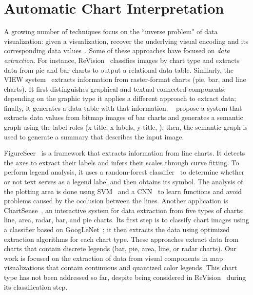 \section{Automatic Chart Interpretation}
\label{sec:chartInterpretation}
A growing number of techniques focus on the ``inverse problem" of data visualization: given a visualization, recover the underlying visual encoding and its corresponding data values~\citep{Poco2017a}. Some of these approaches have focused on \emph{data extraction}. For instance, ReVision~\citep{Savva2011} classifies images by chart type and extracts data from pie and bar charts to output a relational data table. Similarly, the VIEW system~\citep{Gao2012} extracts information from raster-format charts (\eg pie, bar, and line charts). It first distinguishes graphical and textual connected-components; depending on the graphic type it applies a different approach to extract data; finally, it generates a data table with that information. \citeauthor{Al-Zaidy2016}~\citet{Al-Zaidy2016} propose a system that extracts data values from bitmap images of bar charts and generates a semantic graph using the label roles (\eg x-title, x-labels, y-title, \etc); then, the semantic graph is used to generate a summary that describes the input image.

FigureSeer~\citep{Siegel2016} is a framework that extracts information from line charts. It detects the axes to extract their labels and infers their scales through curve fitting. To perform legend analysis, it uses a random-forest classifier~\citep{randForest2001} to determine whether or not text serves as a legend label and then obtains its symbol. The analysis of the plotting area is done using \ac{SVM}~\citep{Cortes1995} and a \ac{CNN}~\citep{LeCun1998} to learn functions and avoid problems caused by the occlusion between the lines. Another application is ChartSense~\citep{Jung2017}, an interactive system for data extraction from five types of charts: line, area, radar, bar, and pie charts. Its first step is to classify chart images using a classifier based on GoogLeNet~\citep{googlenet2014}; it then extracts the data using optimized extraction algorithms for each chart type. 
% 
These approaches extract data from charts that contain discrete legends (\eg bar, pie, area, line, or radar charts). Our work is focused on the extraction of data from visual components in map visualizations that contain continuous and quantized color legends. This chart type has not been addressed so far, despite being considered in ReVision~\citep{Savva2011} during its classification step.

